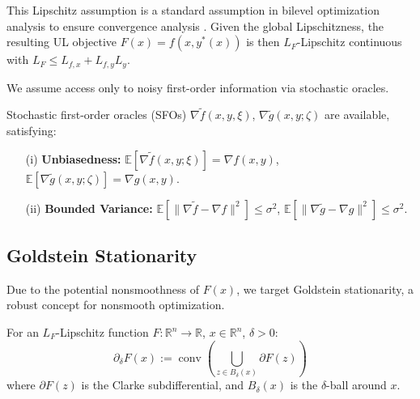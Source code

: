 \documentclass[letterpaper]{article} %
\newcommand{\conv}{\operatorname{conv}}
\newcommand{\1}{\mathbf{1}}
\begin{document}
This Lipschitz assumption is a standard assumption in bilevel optimization analysis to ensure convergence analysis \citep{facchinei2007finite}. Given the global Lipschitzness, the resulting UL objective $F(x) = f(x, y^*(x))$ is then $L_F$-Lipschitz continuous with $L_F \leq L_{f,x} + L_{f,y} L_y$.

We assume access only to noisy first-order information via stochastic oracles.

\begin{assumption}\label{assumption:stochastic_oracle}
Stochastic first-order oracles (SFOs) $\nabla \tilde{f}(x, y, \xi)$, $\nabla \tilde{g}(x, y; \zeta)$ are available, satisfying:
\begin{itemize}
    \item[(i)] \textbf{Unbiasedness:} $\mathbb{E}[\nabla \tilde{f}(x, y; \xi)] = \nabla f(x, y)$, $\mathbb{E}[\nabla \tilde{g}(x, y; \zeta)] = \nabla g(x, y)$.
    \item[(ii)] \textbf{Bounded Variance:} $\mathbb{E}[\|\nabla \tilde{f} - \nabla f\|^2] \leq \sigma^2$, $\mathbb{E}[\|\nabla \tilde{g} - \nabla g\|^2] \leq \sigma^2$.
\end{itemize}
\end{assumption}

\subsection{Goldstein Stationarity}

Due to the potential nonsmoothness of $F(x)$, we target Goldstein stationarity, a robust concept for nonsmooth optimization.

\begin{definition}\label{def:goldstein}
For an $L_F$-Lipschitz function $F: \mathbb{R}^n \to \mathbb{R}$, $x \in \mathbb{R}^n$, $\delta > 0$:
$$
\partial_\delta F(x) := \conv\left(\bigcup_{z \in B_\delta(x)} \partial F(z)\right)
$$
where $\partial F(z)$ is the Clarke subdifferential, and $B_\delta(x)$ is the $\delta$-ball around $x$.
\end{definition}
\end{document}
